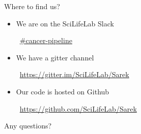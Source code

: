 \documentclass{beamer}
\begin{document}
\begin{frame}{Where to find us?}
	\begin{itemize}
		\item We are on the SciLifeLab Slack

		\faSlack\ \href{https://scilifelab.slack.com/}{\#cancer-pipeline}
		\pause
		\item We have a gitter channel

		\faGroup\ \url{https://gitter.im/SciLifeLab/Sarek}
		\pause
		\item Our code is hosted on Github

		\faGithub\ \url{https://github.com/SciLifeLab/Sarek}
	\end{itemize}
\end{frame}



\begin{frame}{Any questions?}
\end{frame}
\end{document}

